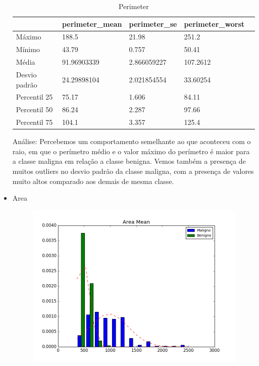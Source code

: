 \documentclass[11pt,a4paper]{article}
\numberwithin{equation}{section}
\begin{document}
\begin{itemize}
\begin{table}[H]
\centering
\caption{Perimeter}
\label{my-label}
\begin{tabular}{lllll} \hline
              & perimeter\_mean & perimeter\_se & perimeter\_worst &  \\ \hline
Máximo        & 188.5           & 21.98         & 251.2            &  \\
Mínimo        & 43.79           & 0.757         & 50.41            &  \\
Média         & 91.96903339     & 2.866059227   & 107.2612         &  \\
Desvio padrão & 24.29898104     & 2.021854554   & 33.60254         &  \\
Percentil 25  & 75.17           & 1.606         & 84.11            &  \\
Percentil 50  & 86.24           & 2.287         & 97.66            &  \\
Percentil 75  & 104.1           & 3.357         & 125.4            & \\ \hline
\end{tabular}
\end{table}

Análise: Percebemos um comportamento semelhante ao que aconteceu com o raio, em que o perímetro médio e o valor máximo do perímetro é maior para a classe maligna em relação a classe benigna. Vemos também a presença de muitos outliers no desvio padrão da classe maligna, com a presença de valores muito altos comparado aos demais de mesma classe.

\item Area
\begin{figure}[H]
\centering
  \includegraphics[width=.5\linewidth]{../img/hist/area_mean}
  \label{fig:test1}
\end{figure}%


\end{itemize}
\end{document}
